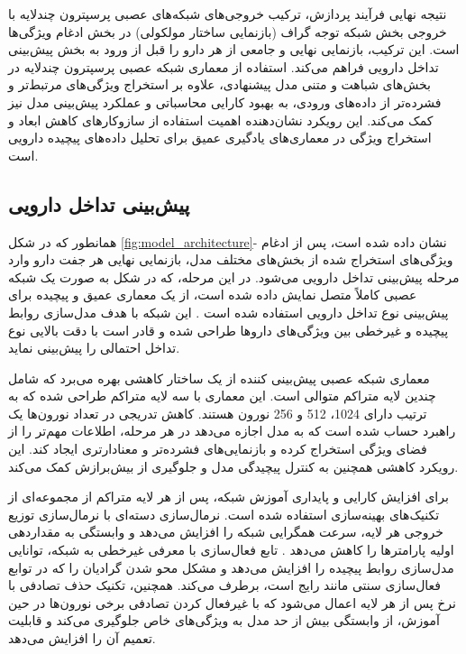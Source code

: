 نتیجه نهایی فرآیند پردازش، ترکیب خروجی‌های شبکه‌های عصبی پرسپترون چندلایه با خروجی بخش شبکه توجه گراف (بازنمایی ساختار مولکولی) در بخش ادغام ویژگی‌ها است. این ترکیب، بازنمایی نهایی و جامعی از هر دارو را قبل از ورود به بخش پیش‌بینی تداخل دارویی فراهم می‌کند. استفاده از معماری شبکه عصبی پرسپترون چندلایه در بخش‌های شباهت و متنی مدل پیشنهادی، علاوه بر استخراج ویژگی‌های مرتبط‌تر و فشرده‌تر از داده‌های ورودی، به بهبود کارایی محاسباتی و عملکرد پیش‌بینی مدل نیز کمک می‌کند. این رویکرد نشان‌دهنده اهمیت استفاده از سازوکار‌های کاهش ابعاد و استخراج ویژگی در معماری‌های یادگیری عمیق برای تحلیل داده‌های پیچیده دارویی است.

\subsection{پیش‌بینی تداخل دارویی}

همانطور که در شکل \ref{fig:model_architecture}- نشان داده شده است، پس از ادغام ویژگی‌های استخراج شده از بخش‌های مختلف مدل، بازنمایی نهایی هر جفت دارو وارد مرحله پیش‌بینی تداخل دارویی می‌شود. در این مرحله، که در شکل به صورت یک شبکه عصبی کاملاً متصل نمایش داده شده است، از یک معماری عمیق و پیچیده برای پیش‌بینی نوع تداخل دارویی استفاده شده است \cite{ref_dai2020}. این شبکه با هدف مدل‌سازی روابط پیچیده و غیرخطی بین ویژگی‌های داروها طراحی شده و قادر است با دقت بالایی نوع تداخل احتمالی را پیش‌بینی نماید.

معماری شبکه عصبی پیش‌بینی کننده از یک ساختار کاهشی بهره می‌برد که شامل چندین لایه متراکم متوالی است. این معماری با سه لایه متراکم طراحی شده که به ترتیب دارای 1024، 512 و 256 نورون هستند. کاهش تدریجی در تعداد نورون‌ها یک راهبرد حساب شده است که به مدل اجازه می‌دهد در هر مرحله، اطلاعات مهم‌تر را از فضای ویژگی استخراج کرده و بازنمایی‌های فشرده‌تر و معنادارتری ایجاد کند. این رویکرد کاهشی همچنین به کنترل پیچیدگی مدل و جلوگیری از بیش‌برازش کمک می‌کند.

برای افزایش کارایی و پایداری آموزش شبکه، پس از هر لایه متراکم از مجموعه‌ای از تکنیک‌های بهینه‌سازی استفاده شده است. نرمال‌سازی دسته‌ای با نرمال‌سازی توزیع خروجی هر لایه، سرعت همگرایی شبکه را افزایش می‌دهد و وابستگی به مقداردهی اولیه پارامترها را کاهش می‌دهد \cite{ref_dai2020}. تابع فعال‌سازی  با معرفی غیرخطی به شبکه، توانایی مدل‌سازی روابط پیچیده را افزایش می‌دهد و مشکل محو شدن گرادیان را که در توابع فعال‌سازی سنتی مانند  رایج است، برطرف می‌کند. همچنین، تکنیک حذف تصادفی با نرخ  پس از هر لایه اعمال می‌شود که با غیرفعال کردن تصادفی برخی نورون‌ها در حین آموزش، از وابستگی بیش از حد مدل به ویژگی‌های خاص جلوگیری می‌کند و قابلیت تعمیم آن را افزایش می‌دهد.


